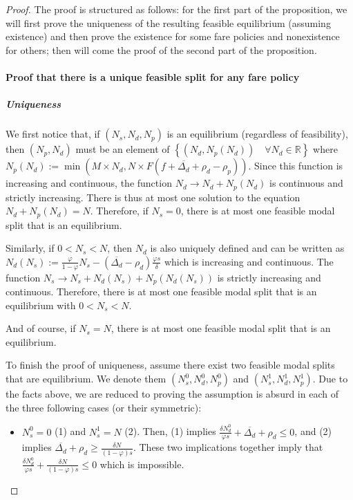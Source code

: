 \documentclass[english, a4paper]{article}
\theoremstyle{plain}
\theoremstyle{definition}
\theoremstyle{remark}
\begin{document}
\begin{proof}
    The proof is structured as follows: for the first part of the proposition, we will first prove the uniqueness of the resulting feasible equilibrium (assuming existence) and then prove the existence for some fare policies and nonexistence for others; then will come the proof of the second part of the proposition.

    \item \paragraph{Proof that there is a unique feasible split for any fare policy}
    \item \subparagraph{Uniqueness}
    We first notice that, if $(N_s, N_d, N_p)$ is an equilibrium (regardless of feasibility), then $(N_p, N_d)$ must be an element of $\left\{ (N_d, N_p(N_d)) \quad \forall N_d\in\mathbb{R} \right\}$ where $N_p(N_d) := \min (M\times N_d, N \times F(f + \overline{\Delta _d} + \rho _d - \rho _p))$\footnotemark. Since this function is increasing and continuous, the function $N_d \longrightarrow N_d + N_p(N_d)$ is continuous and strictly increasing. There is thus at most one solution to the equation $N_d + N_p(N_d) = N$. Therefore, if $N_s = 0$, there is at most one feasible modal split that is an equilibrium.
    
    Similarly, if $0 < N_s < N$, then $N_d$ is also uniquely defined and can be written as $N_d (N_s) := \frac{\varphi}{1-\varphi}N_s - (\overline{\Delta _d} - \rho _d)\frac{\varphi s}{\delta}$ which is increasing and continuous. The function $N_s \longrightarrow N_s + N_d(N_s) + N_p(N_d(N_s))$ is strictly increasing and continuous. Therefore, there is at most one feasible modal split that is an equilibrium with $0 < N_s < N$.

    And of course, if $N_s = N$, there is at most one feasible modal split that is an equilibrium.
    

    To finish the proof of uniqueness, assume there exist two feasible modal splits that are equilibrium. We denote them $(N_s^0, N_d^0, N_p^0)$ and $(N_s^1, N_d^1, N_p^1)$. Due to the facts above, we are reduced to proving the assumption is absurd in each of the three following cases (or their symmetric):
    \begin{itemize}
        \item $N_s^0 = 0$ (1) and $N_s^1= N$ (2). Then, (1) implies $\frac{\delta N_d^0}{\varphi s} + \overline{\Delta _d} + \rho _d \leq 0$, and (2) implies $\overline{\Delta _d} + \rho _d \geq \frac{\delta N}{(1-\varphi)s}$. These two implications together imply that $\frac{\delta N_d^0}{\varphi s} + \frac{\delta N}{(1-\varphi)s} \leq 0$ which is impossible.


\end{itemize}
\end{proof}
\end{document}
